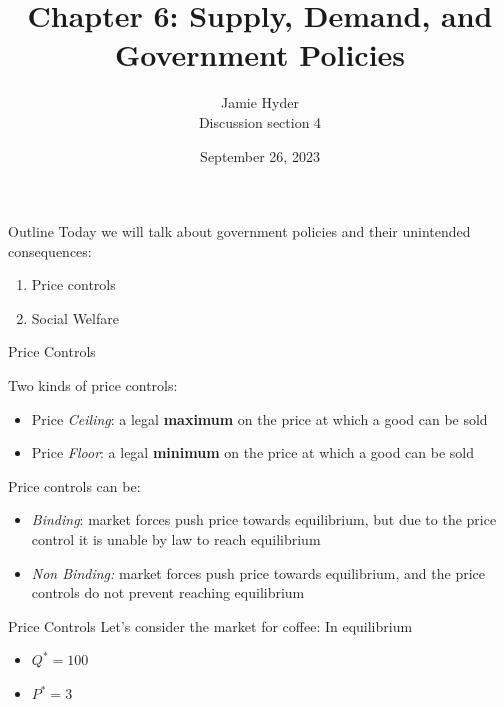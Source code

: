 \documentclass[compress]{beamer}
\title{Chapter 6: Supply, Demand, and Government Policies}
\author{Jamie Hyder \\
    Discussion section 4}
\date{September 26, 2023}
\begin{document}
\begin{frame}
    \titlepage 
\end{frame}

\begin{frame}{Outline}
    Today we will talk about government policies and their unintended consequences:
    \begin{enumerate}
        \item Price controls
        \item Social Welfare
    \end{enumerate}
\end{frame}

\begin{frame}{Price Controls}
\begin{block}{Two kinds of price controls:}
    \begin{itemize}
        \item Price \textit{Ceiling}: a legal \textbf{maximum} on the price at which a good can be sold
        \item Price \textit{Floor}: a legal \textbf{minimum} on the price at which a good can be sold
    \end{itemize}
\end{block}

\begin{block}{Price controls can be:}
    \begin{itemize}
        \item \textit{Binding}: market forces push price towards equilibrium, but due to the price control it is unable by law to reach equilibrium
        \item \textit{Non Binding:} market forces push price towards equilibrium, and the price controls do not prevent reaching equilibrium
    \end{itemize}
\end{block}
\end{frame}

\begin{frame}{Price Controls}
    Let's consider the market for coffee: In equilibrium
    \begin{itemize}
        \item $Q^* = 100$
        \item $P^* = 3$
    \end{itemize}
\end{frame}
\end{document}
